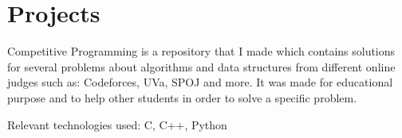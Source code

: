 \documentclass[]{deedy-resume-openfont}
\begin{document}
\begin{minipage}[t]{0.66\textwidth}






\section{Projects}

\begin{tightemize}
\item {Competitive Programming is a repository that I made which contains solutions for several problems about algorithms and data structures from different online judges such as: Codeforces, UVa, SPOJ and more. It was made for educational purpose and to help other students in order to solve a specific problem.}
\item {Relevant technologies used: C, C++, Python}
\end{tightemize}


\end{minipage}
\end{document}
